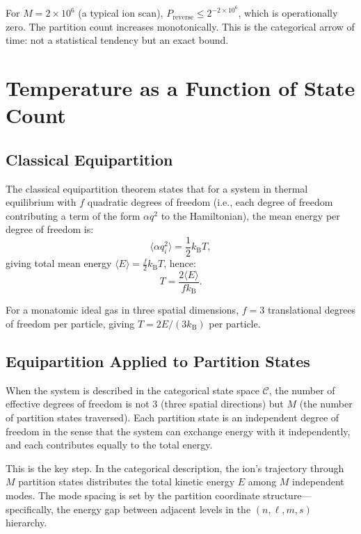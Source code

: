 \documentclass[twocolumn,10pt]{article}
\newcommand{\kB}{k_{\mathrm{B}}}
\begin{document}
For $M = 2 \times 10^6$ (a typical ion scan), $P_{\mathrm{reverse}} \leq 2^{-2\times10^6}$, which is operationally zero. The partition count increases monotonically. This is the categorical arrow of time: not a statistical tendency but an exact bound.

\section{Temperature as a Function of State Count}
\label{sec:temperature}

\subsection{Classical Equipartition}

The classical equipartition theorem \citep{boltzmann1896} states that for a system in thermal equilibrium with $f$ quadratic degrees of freedom (i.e., each degree of freedom contributing a term of the form $\alpha q^2$ to the Hamiltonian), the mean energy per degree of freedom is:
\begin{equation}
    \langle \alpha q_i^2 \rangle = \frac{1}{2}\kB T,
\end{equation}
giving total mean energy $\langle E \rangle = \frac{f}{2}\kB T$, hence:
\begin{equation}
    T = \frac{2\langle E \rangle}{f \kB}.
    \label{eq:classical_T}
\end{equation}

For a monatomic ideal gas in three spatial dimensions, $f = 3$ translational degrees of freedom per particle, giving $T = 2E/(3\kB)$ per particle.

\subsection{Equipartition Applied to Partition States}

When the system is described in the categorical state space $\mathcal{C}$, the number of effective degrees of freedom is not 3 (three spatial directions) but $M$ (the number of partition states traversed). Each partition state is an independent degree of freedom in the sense that the system can exchange energy with it independently, and each contributes equally to the total energy.

This is the key step. In the categorical description, the ion's trajectory through $M$ partition states distributes the total kinetic energy $E$ among $M$ independent modes. The mode spacing is set by the partition coordinate structure---specifically, the energy gap between adjacent levels in the $(n, \ell, m, s)$ hierarchy.
\end{document}
